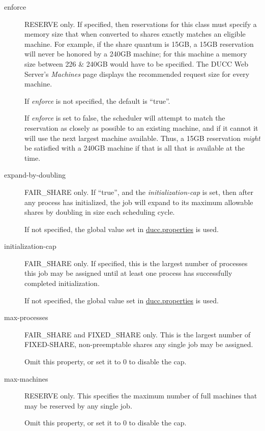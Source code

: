 \begin{description}
      \item[enforce] RESERVE only.  If specified, then reservations for this class must specify a
        memory size that when converted to shares exactly matches an eligible machine.  For example,
        if the share quantum is 15GB, a 15GB reservation will never be honored by a 240GB machine; 
        for this machine a memory size between 226 \& 240GB would have to be specified.  
        The DUCC Web Server's {\em Machines} page displays the recommended request size for every machine.  

        If {\em enforce} is not specified, the default is ``true''.

        If {\em enforce} is set to false, the scheduler will attempt to match the reservation as 
        closely as possible to an existing machine, and if it cannot it will use the next largest
        machine available.  Thus, a 15GB reservation {\em might} be satisfied with a 240GB machine if
        that is all that is available at the time.

      \item[expand-by-doubling] FAIR\_SHARE only.  If ``true'', and the {\em initialization-cap} is
        set, then after any process has initialized, the job will expand to its maximum allowable
        shares by doubling in size each scheduling cycle.  

        If not specified, the global value set in \hyperref[sec:ducc.properties]{ducc.properties} is used.

      \item[initialization-cap] FAIR\_SHARE only. If specified, this is the largest number of processes this job
        may be assigned until at least one process has successfully completed initialization.

        If not specified, the global value set in \hyperref[sec:ducc.properties]{ducc.properties} is used.

      \item[max-processes] FAIR\_SHARE and FIXED\_SHARE only.  This is the largest number of FIXED-SHARE,
        non-preemptable shares any single job may be assigned.

        Omit this property, or set it to 0 to disable the cap.

      \item[max-machines] RESERVE only.  This specifies the maximum number of full machines that
        may be reserved by any single job.

        Omit this property, or set it to 0 to disable the cap.


\end{description}
